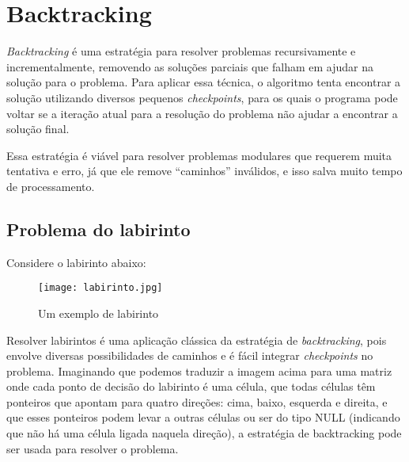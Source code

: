 \section{Backtracking} \label{sec:backtracking}

\emph{Backtracking} é uma estratégia para resolver problemas recursivamente e incrementalmente,
removendo as soluções parciais que falham em ajudar na solução para o problema. Para aplicar essa
técnica, o algoritmo tenta encontrar a solução utilizando diversos pequenos \emph{checkpoints}, para os
quais o programa pode voltar se a iteração atual para a resolução do problema não ajudar a encontrar a
solução final.

Essa estratégia é viável para resolver problemas modulares que requerem muita tentativa e erro, já que ele
remove “caminhos” inválidos, e isso salva muito tempo de processamento.

\subsection{Problema do labirinto}

Considere o labirinto abaixo:

\begin{figure}[ht]
  \centering
  \texttt{[image: labirinto.jpg]}
  \caption{Um exemplo de labirinto}
  \label{fig:labirinto}
\end{figure}

Resolver labirintos é uma aplicação clássica da estratégia de \emph{backtracking}, pois envolve diversas
possibilidades de caminhos e é fácil integrar \emph{checkpoints} no problema.
Imaginando que podemos traduzir a imagem acima para uma matriz onde cada ponto de decisão do
labirinto é uma célula, que todas células têm ponteiros que apontam para quatro direções: cima, baixo,
esquerda e direita, e que esses ponteiros podem levar a outras células ou ser do tipo NULL (indicando que
não há uma célula ligada naquela direção), a estratégia de backtracking pode ser usada para resolver o
problema.

\newpage